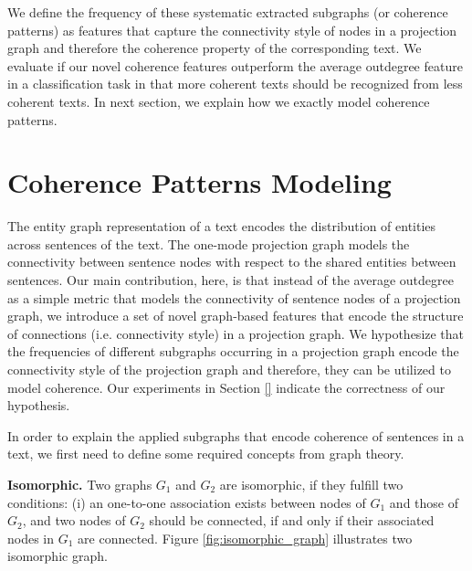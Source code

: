 We define the frequency of these systematic extracted subgraphs (or coherence patterns) as features that capture the connectivity style of nodes in a projection graph and therefore the coherence property of the corresponding text.  
We evaluate if our novel coherence features outperform the average outdegree feature in a classification task in that more coherent texts should be recognized from less coherent texts. 
In next section, we explain how we exactly model coherence patterns. 



\section{Coherence Patterns Modeling}
\label{sec:coherence_patterns_modeling}
%
The entity graph representation of a text encodes the distribution of entities across sentences of the text. 
The one-mode projection graph models the connectivity between sentence nodes with respect to the shared entities between sentences. 
Our main contribution, here, is that instead of the average outdegree as a simple metric that models the connectivity of sentence nodes of a projection graph, we introduce a set of novel graph-based features that encode the structure of connections (i.e. connectivity style) in a projection graph. 
We hypothesize that the frequencies of different subgraphs occurring in a projection graph encode the connectivity style of the projection graph and therefore, they can be utilized to model coherence. 
Our experiments in Section \ref{} indicate the correctness of our hypothesis. 


In order to explain the applied subgraphs that encode coherence of sentences in a text, we first need to define some required concepts from graph theory. 


\textbf{Isomorphic.} 
%
Two graphs $G_1$ and $G_2$ are isomorphic, if they fulfill two conditions: (i) an one\--to\--one association exists between nodes of $G_1$ and those of $G_2$, and two nodes of $G_2$ should be connected, if and only if their associated nodes in $G_1$ are connected. 
Figure \ref{fig:isomorphic_graph} illustrates two isomorphic graph. 

